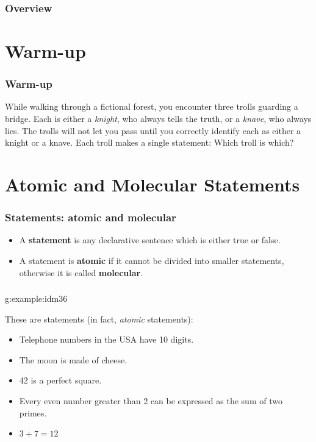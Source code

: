 \documentclass[11pt, compress]{beamer}
\title{}
\subtitle{}
\newcommand{\terminology}[1]{\textbf{#1}}\newcommand{\lt}{<}
\begin{document}
\begin{frame}
\maketitle 
\end{frame}
 
\begin{frame}
\frametitle{Overview}
\tableofcontents 
\end{frame}
 

\section{Warm-up}
\begin{frame}
\frametitle{Warm-up}
 
While walking through a fictional forest, you encounter three trolls guarding a bridge. Each is either a \emph{knight}, who always tells the truth, or a \emph{knave}, who always lies. The trolls will not let you pass until you correctly identify each as either a knight or a knave. Each troll makes a single statement: 
Which troll is which?\end{frame}
 


\section{Atomic and Molecular Statements}
\begin{frame}
\frametitle{Statements: atomic and molecular}
 
\begin{itemize}
\item{}
A \terminology{statement} is any declarative sentence which is either true or false.

\item{}
A statement is \terminology{atomic} if it cannot be divided into smaller statements, otherwise it is called \terminology{molecular}.
\end{itemize}\end{frame}
 
\begin{frame}
\frametitle{}
\begin{example}{}{g:example:idm36}%

These are statements (in fact, \emph{atomic} statements):\begin{itemize}
\item{}
Telephone numbers in the USA have 10 digits.

\item{}
The moon is made of cheese.

\item{}
42 is a perfect square.

\item{}
Every even number greater than 2 can be expressed as the sum of two primes.

\item{}
\(3+7 = 12\)
\end{itemize}\end{example}
\end{frame}
 
\end{document}
